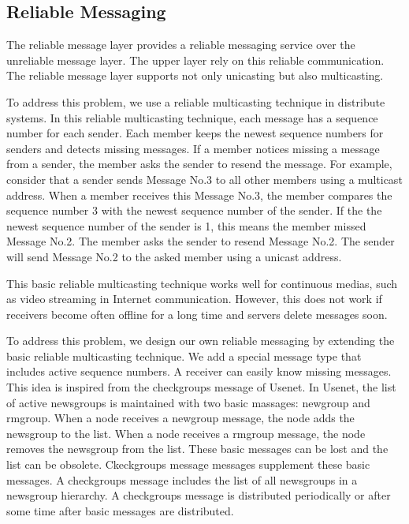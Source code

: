 \documentclass[twocolumn,10pt]{article}
\begin{document}
\subsection{Reliable Messaging}

The reliable message layer provides a reliable messaging service over the unreliable message layer.
The upper layer rely on this reliable communication.
The reliable message layer supports not only unicasting but also multicasting.

To address this problem, we use a reliable multicasting technique in distribute systems\cite{tanenbaum2007distributed}.
In this reliable multicasting technique, each message has a sequence number for each sender.
Each member keeps the newest sequence numbers for senders and detects missing messages.
If a member notices missing a message from a sender, the member asks the sender to resend the message.
For example, consider that a sender sends Message No.3 to all other members using a multicast address.
When a member receives this Message No.3, the member compares the sequence number 3 with the newest sequence number of the sender.
If the the newest sequence number of the sender is 1, this means the member missed Message No.2.
The member asks the sender to resend Message No.2.
The sender will send Message No.2 to the asked member using a unicast address.

This basic reliable multicasting technique works well for continuous medias, such as video streaming in Internet communication.
However, this does not work if receivers become often offline for a long time and servers delete messages soon.

To address this problem, we design our own reliable messaging by extending the basic reliable multicasting technique.
We add a special message type that includes active sequence numbers.
A receiver can easily know missing messages.
This idea is inspired from the checkgroups message of Usenet\cite{usenet}.
In Usenet, the list of active newsgroups is maintained with two basic massages: newgroup and rmgroup.
When a node receives a newgroup message, the node adds the newsgroup to the list.
When a node receives a rmgroup message, the node removes the newsgroup from the list.
These basic messages can be lost and the list can be obsolete.
Ckeckgroups message messages supplement these basic messages.
A checkgroups message includes the list of all newsgroups in a newsgroup hierarchy.
A checkgroups message is distributed periodically or after some time after basic messages are distributed.
\end{document}
